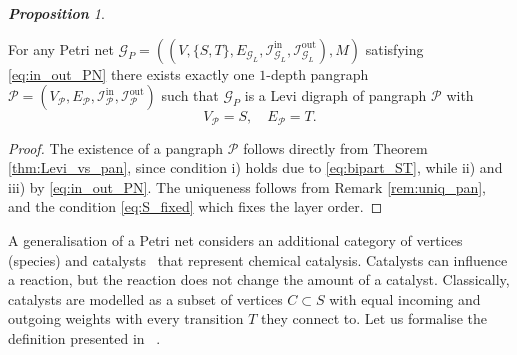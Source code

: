 \documentclass[a4paper,12pt]{article}
\theoremstyle{definition}
\theoremstyle{remark}
\newcommand{\mG}{\mathcal{G}}
\newcommand{\mP}{\mathcal{P}}
\newcommand{\tin}{\mathrm{in}}
\newcommand{\out}{\mathrm{out}}
\newcommand{\inci}{\mathcal{I}^{\tin}}
\newcommand{\inco}{\mathcal{I}^{\out}}
\newtheorem{prop}{\small\bf Proposition}
\begin{document}
\begin{prop}\label{prop:Petri}


For any Petri net $\mG_P=((V,\{S,T\},E_{\mathcal{G}_L}, \inci_{\mG_L},\inco_{\mG_L}),M)$ satisfying \eqref{eq:in_out_PN} there exists exactly one $1$-depth pangraph $\mP=(V_{\mP},E_{\mP}, \inci_{\mP},\inco_{\mP})$ such that $\mG_P$ is a Levi digraph of pangraph $\mP$ with
\begin{equation}\label{eq:S_fixed}
V_{\mP}=S,\quad E_{\mP}=T.
\end{equation}
\end{prop}
\begin{proof}
The existence of a pangraph $\mP$ follows directly from Theorem \ref{thm:Levi_vs_pan}, since condition i) holds due to \eqref{eq:bipart_ST}, while ii) and iii) by \eqref{eq:in_out_PN}. The uniqueness follows from Remark \ref{rem:uniq_pan}, and the condition \ref{eq:S_fixed} which fixes the layer order.   
\end{proof}

A generalisation of a Petri net considers an additional category of vertices (species) and catalysts~\cite{Baez_2019_catalysts} that represent chemical catalysis. Catalysts can influence a reaction, but the reaction does not change the amount of a catalyst. Classically, catalysts are modelled as a subset of vertices $C \subset S$ with equal incoming and outgoing weights with every transition $T$ they connect to. Let us formalise the definition presented in ~\cite{Baez_2019_catalysts}.
\end{document}
